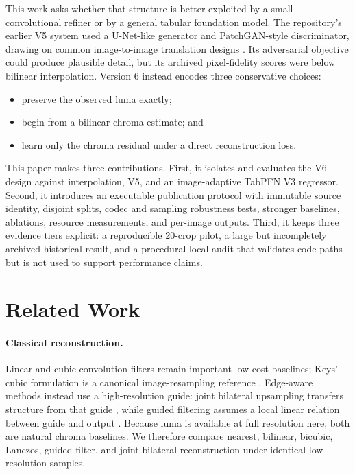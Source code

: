 \documentclass[10pt,twocolumn]{article}
\begin{document}
This work asks whether that structure is better exploited by a small
convolutional refiner or by a general tabular foundation model.  The repository's
earlier V5 system used a U-Net-like generator and PatchGAN-style discriminator,
drawing on common image-to-image translation designs
\cite{ronneberger2015unet,isola2017pix2pix}.  Its adversarial objective could
produce plausible detail, but its archived pixel-fidelity scores were below
bilinear interpolation.  Version 6 instead encodes three conservative choices:

\begin{itemize}
  \setlength\itemsep{1pt}
  \item preserve the observed luma exactly;
  \item begin from a bilinear chroma estimate; and
  \item learn only the chroma residual under a direct reconstruction loss.
\end{itemize}

This paper makes three contributions.  First, it isolates and evaluates the V6
design against interpolation, V5, and an image-adaptive TabPFN V3 regressor.
Second, it introduces an executable publication protocol with immutable source
identity, disjoint splits, codec and sampling robustness tests, stronger
baselines, ablations, resource measurements, and per-image outputs.  Third, it
keeps three evidence tiers explicit: a reproducible 20-crop pilot, a large but
incompletely archived historical result, and a procedural local audit that
validates code paths but is not used to support performance claims.

\section{Related Work}

\paragraph{Classical reconstruction.}
Linear and cubic convolution filters remain important low-cost baselines; Keys'
cubic formulation is a canonical image-resampling reference
\cite{keys1981cubic}.  Edge-aware methods instead use a high-resolution guide:
joint bilateral upsampling transfers structure from that guide
\cite{kopf2007jbu}, while guided filtering assumes a local linear relation
between guide and output \cite{he2010guided}.  Because luma is available at full
resolution here, both are natural chroma baselines.  We therefore compare
nearest, bilinear, bicubic, Lanczos, guided-filter, and joint-bilateral
reconstruction under identical low-resolution samples.
\end{document}
